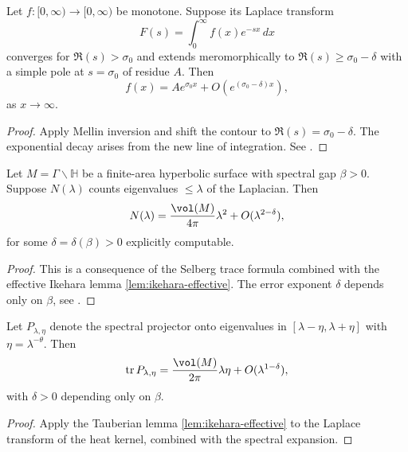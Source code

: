 \medskip

\begin{proposition}\label{prop:laplace-tauber}
Let $f:[0,\infty)\to [0,\infty)$ be monotone. Suppose its Laplace transform
\[
F(s) = \int_0^\infty f(x) e^{-s x}\, dx
\]
converges for $\Re(s) > \sigma_0$ and extends meromorphically to $\Re(s)\ge \sigma_0-\delta$ with a simple pole at $s=\sigma_0$ of residue $A$. Then
\[
f(x) = A e^{\sigma_0 x} + O(e^{(\sigma_0-\delta) x}),
\]
as $x\to \infty$.
\end{proposition}

\begin{proof}
Apply Mellin inversion and shift the contour to $\Re(s)=\sigma_0-\delta$. The exponential decay arises from the new line of integration.  
See \cite{Ingham1935, Korevaar2004}.  
\end{proof}

\medskip

\begin{lemma}\label{lem:tauber-gap}
Let $M=\Gamma\backslash \mathbb H$ be a finite-area hyperbolic surface with spectral gap $\beta>0$.  
Suppose $N(\lambda)$ counts eigenvalues $\le \lambda$ of the Laplacian.  
Then
\[
N(\lambda) = \frac{\vol(M)}{4\pi} \lambda^2 + O(\lambda^{2-\delta}),
\]
for some $\delta=\delta(\beta)>0$ explicitly computable.  
\end{lemma}

\begin{proof}
This is a consequence of the Selberg trace formula combined with the effective Ikehara lemma \ref{lem:ikehara-effective}.  
The error exponent $\delta$ depends only on $\beta$, see \cite{Iwaniec2002, JakobsonNaud2007}.  
\end{proof}

\medskip

\begin{corollary}\label{cor:localweyl-tauber}
Let $P_{\lambda,\eta}$ denote the spectral projector onto eigenvalues in $[\lambda-\eta,\lambda+\eta]$ with $\eta=\lambda^{-\theta}$.  
Then
\[
\operatorname{tr} P_{\lambda,\eta} = \frac{\vol(M)}{2\pi}\lambda \eta + O(\lambda^{1-\delta}),
\]
with $\delta>0$ depending only on $\beta$.  
\end{corollary}

\begin{proof}
Apply the Tauberian lemma \ref{lem:ikehara-effective} to the Laplace transform of the heat kernel, combined with the spectral expansion.  
\end{proof}

